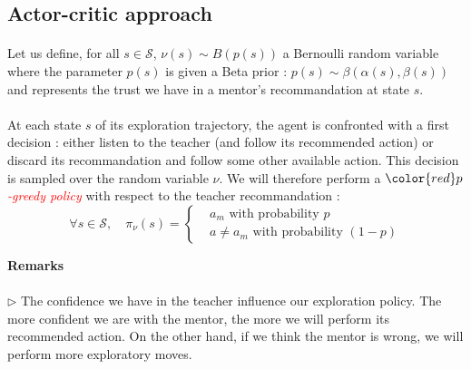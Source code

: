 \documentclass[a4paper]{report}
\begin{document}
{{{		\subsection{Actor-critic approach}
		{
			\paragraph{}  Let us define, for all $s\in\mathcal{S}$, $\nu(s) \sim B(p(s))$ a Bernoulli random variable where the parameter $p(s)$ is given a Beta prior : $p(s)\sim \beta(\alpha(s),\beta(s))$ and represents the trust we have in a mentor's recommandation at state $s$. 
			
			\paragraph{} At each state $s$ of its exploration trajectory, the agent is confronted with a first decision : either listen to the teacher (and follow its recommended action) or discard its recommandation and follow some other available action. This decision is sampled over the random variable $\nu$. \newline
			We will therefore perform a $\color{red}p$\textcolor{red}{\emph{-greedy policy}} with respect to the teacher recommandation : 
			\begin{equation}
				\forall s\in\mathcal{S}, \quad \pi_\nu(s) = 
					\left\{ 
					\begin{aligned}
						&a_m \text{ with probability } p \\
						& a\neq a_m \text{ with probability } (1-p)
					\end{aligned}
					\right. 
			\end{equation}
			
			\vspace{10pt}
			\noindent \textbf{Remarks}\\ 
			\vspace{3pt}
			
			\hfill
			\begin{minipage}{0.95\linewidth}
				\begin{leftbar}
						\paragraph{} \noindent $\triangleright$ The confidence we have in the teacher influence our exploration policy. The more confident we are with the mentor, the more we will perform its recommended action. On the other hand, if we think the mentor is wrong, we will perform more exploratory moves. \\

\end{leftbar}
\end{minipage}}}}}
\end{document}
